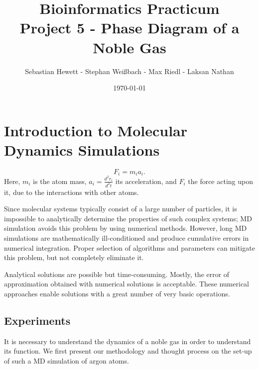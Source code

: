 \documentclass[10pt, a4paper, oneside, twocolumn]{report}
\title{Bioinformatics Practicum\\\textbf{Project 5 - Phase Diagram of a Noble Gas}}
\author{Sebastian Hewett - Stephan Weißbach - Max Riedl - Laksan Nathan}
\date{\today}
\begin{document}
\maketitle

\chapter{Introduction to Molecular Dynamics Simulations}

\begin{equation}\label{eq:2nd law}
F_i = m_i a_i.
\end{equation} %
Here, \(m_i\) is the atom mass, \(a_i = \frac{d^{2}r_i}{d^{2}t}\) its acceleration, and \(F_i\) the force acting upon it, due to the interactions with other atoms.

Since molecular systems typically consist of a large number of particles, it is impossible to analytically determine the properties of such complex systems; MD simulation avoids this problem by using numerical methods. However, long MD simulations are mathematically ill-conditioned and produce cumulative errors in numerical integration. Proper selection of algorithms and parameters can mitigate this problem, but not completely eliminate it.

Analytical solutions are possible but time-consuming. Mostly, the error of approximation obtained with numerical solutions is acceptable. These numerical approaches enable solutions with a great number of very basic operations.

\section{Experiments}

It is necessary to understand the dynamics of a noble gas in order to understand its function. We first present our methodology and thought process on the set-up of such a MD simulation of argon atoms.
\end{document}
